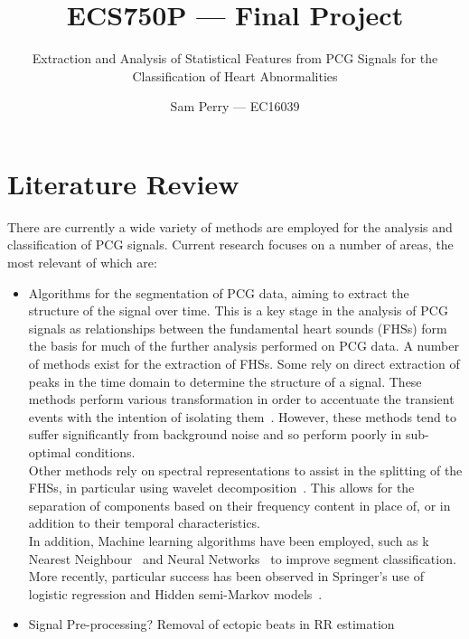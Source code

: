 \documentclass[titlepage]{scrartcl}
\begin{document}
\title{ECS750P --- Final Project}
\subtitle{\LARGE{Extraction and Analysis of Statistical Features from PCG
Signals for the Classification of Heart Abnormalities}}
\author{Sam Perry --- EC16039}

\maketitle

\section{Literature Review}
There are currently a wide variety of methods are employed for the analysis and
classification of PCG signals. Current research focuses on a number of areas,
the most relevant of which are:
\begin{itemize}
    \item Algorithms for the segmentation of PCG data, aiming to extract the
        structure of the signal over time. This is a key stage in the analysis
        of PCG signals as relationships between the fundamental heart sounds
        (FHSs) form the basis for much of the further analysis performed on PCG
        data. A number of methods exist for the extraction of FHSs. Some rely
        on direct extraction of peaks in the time domain to determine the
        structure of a signal. These methods perform various transformation in
        order to accentuate the transient events with the intention of
        isolating them~\parencite{Groch1992, Liang1997}. However, these methods
        tend to suffer significantly from background noise and so perform
        poorly in sub-optimal conditions.\\
        Other methods rely on spectral representations to assist in the
        splitting of the FHSs, in particular using wavelet
        decomposition~\parencite{LiangHuiying1997, Vepa2008}. This allows for
        the separation of components based on their frequency content in
        place of, or in addition to their temporal characteristics.\\
        In addition,  Machine learning algorithms have been employed, such as k
        Nearest Neighbour~\parencite{Gupta2007} and Neural
        Networks~\parencite{Oskiper2002} to improve segment classification.
        More recently, particular success has been observed in Springer's use
        of logistic regression and Hidden semi-Markov
        models~\citeyearpar{Springer2016}.
    \item Signal Pre-processing?
        Removal of ectopic beats in RR estimation~\parencite{Dash2009}


\end{itemize}
\end{document}
